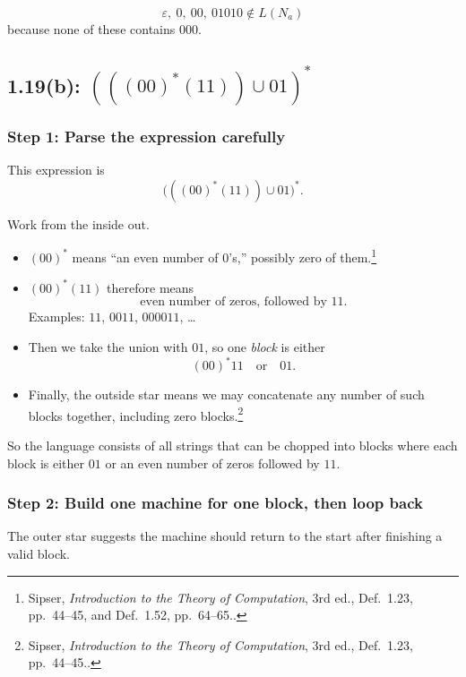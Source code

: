 \documentclass[12pt]{article}
\newcommand{\sipser}[1]{\footnote{Sipser, \emph{Introduction to the Theory of Computation}, 3rd ed., #1.}}
\begin{document}
\[
\varepsilon,\ 0,\ 00,\ 01010 \notin L(N_a)
\]
because none of these contains \(000\).

\subsection*{1.19(b): \((((00)^*(11))\cup 01)^*\)}

\subsubsection*{Step 1: Parse the expression carefully}

This expression is
\[
\big( ((00)^*(11)) \cup 01 \big)^*.
\]

Work from the inside out.

\begin{itemize}[itemsep=0.4em]
    \item \((00)^*\) means ``an even number of \(0\)'s,'' possibly zero of them.\sipser{Def.~1.23, pp.~44--45, and Def.~1.52, pp.~64--65.}
    \item \((00)^*(11)\) therefore means
    \[
    \text{even number of zeros, followed by }11.
    \]
    Examples: \(11\), \(0011\), \(000011\), \dots
    \item Then we take the union with \(01\), so one \emph{block} is either
    \[
    (00)^*11 \quad \text{or} \quad 01.
    \]
    \item Finally, the outside star means we may concatenate any number of such blocks together, including zero blocks.\sipser{Def.~1.23, pp.~44--45.}
\end{itemize}

So the language consists of all strings that can be chopped into blocks where each block is either \(01\) or an even number of zeros followed by \(11\).

\subsubsection*{Step 2: Build one machine for one block, then loop back}

The outer star suggests the machine should return to the start after finishing a valid block.

\begin{center}
\end{center}
\end{document}
